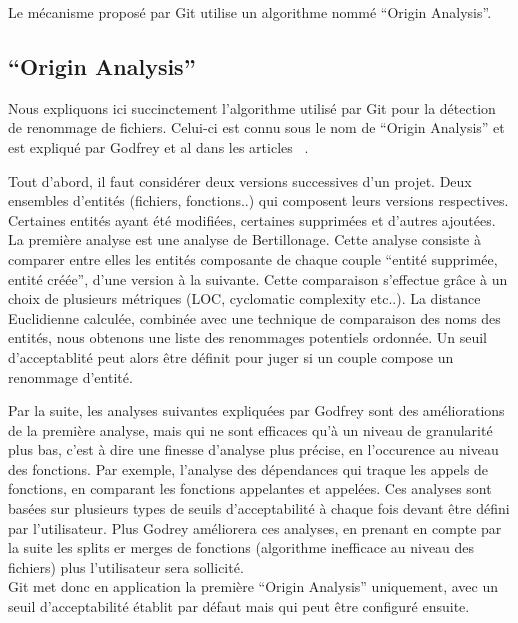 Le mécanisme proposé par Git utilise un algorithme nommé ``Origin Analysis''.

\subsection{``Origin Analysis''}

Nous expliquons ici succinctement l'algorithme utilisé par Git pour la détection de renommage de fichiers. Celui-ci est connu sous le nom de ``Origin Analysis'' et est expliqué par Godfrey et al dans les articles ~\cite{tu_integrated_2002,godfrey_tracking_2002,godfrey_using_2005}.

Tout d'abord, il faut considérer deux versions successives d'un projet. Deux ensembles d'entités (fichiers, fonctions..) qui composent leurs versions respectives. Certaines entités ayant été modifiées, certaines supprimées et d'autres ajoutées.
La première analyse est une analyse de Bertillonage. Cette analyse consiste à comparer entre elles les entités composante de chaque couple ``entité supprimée, entité créée'', d'une version à la suivante. Cette comparaison s'effectue grâce à un choix de plusieurs métriques (LOC, cyclomatic complexity etc..). La distance Euclidienne calculée, combinée avec une technique de comparaison des noms des entités, nous obtenons une liste des renommages potentiels ordonnée. Un seuil d'acceptablité peut alors être définit pour juger si un couple compose un renommage d'entité. 

Par la suite, les analyses suivantes expliquées par Godfrey sont des améliorations de la première analyse, mais qui ne sont efficaces qu'à un niveau de granularité plus bas, c'est à dire une finesse d'analyse plus précise, en l'occurence au niveau des fonctions. Par exemple, l'analyse des dépendances qui traque les appels de fonctions, en comparant les fonctions appelantes et appelées. Ces analyses sont basées sur plusieurs types de seuils d'acceptabilité à chaque fois devant être défini par l'utilisateur. Plus Godrey améliorera ces analyses, en prenant en compte par la suite les splits er merges de fonctions (algorithme inefficace au niveau des fichiers) plus l'utilisateur sera sollicité.\\

Git met donc en application la première ``Origin Analysis'' uniquement, avec un seuil d'acceptabilité établit par défaut mais qui peut être configuré ensuite.\\
